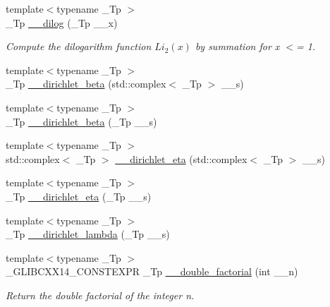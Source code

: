 \begin{DoxyCompactItemize}
\item 
{\footnotesize template$<$typename \+\_\+\+Tp $>$ }\\\+\_\+\+Tp \hyperlink{namespacestd_1_1____detail_a5083a0c9fce3299593ca22e7dbaeaf19}{\+\_\+\+\_\+dilog} (\+\_\+\+Tp \+\_\+\+\_\+x)
\begin{DoxyCompactList}\small\item\em Compute the dilogarithm function $ Li_2(x) $ by summation for x $<$= 1. \end{DoxyCompactList}\item 
{\footnotesize template$<$typename \+\_\+\+Tp $>$ }\\\+\_\+\+Tp \hyperlink{namespacestd_1_1____detail_ad0c8e975438d30cbfb5cad91f3ac6d01}{\+\_\+\+\_\+dirichlet\+\_\+beta} (std\+::complex$<$ \+\_\+\+Tp $>$ \+\_\+\+\_\+s)
\item 
{\footnotesize template$<$typename \+\_\+\+Tp $>$ }\\\+\_\+\+Tp \hyperlink{namespacestd_1_1____detail_a2e4243f8d092d48e16fc45ba0c4e9489}{\+\_\+\+\_\+dirichlet\+\_\+beta} (\+\_\+\+Tp \+\_\+\+\_\+s)
\item 
{\footnotesize template$<$typename \+\_\+\+Tp $>$ }\\std\+::complex$<$ \+\_\+\+Tp $>$ \hyperlink{namespacestd_1_1____detail_a3d8d694bf430ca3959c9e6b00c332468}{\+\_\+\+\_\+dirichlet\+\_\+eta} (std\+::complex$<$ \+\_\+\+Tp $>$ \+\_\+\+\_\+s)
\item 
{\footnotesize template$<$typename \+\_\+\+Tp $>$ }\\\+\_\+\+Tp \hyperlink{namespacestd_1_1____detail_a88be5bbcdf85bbc487b6b86b5cb65d98}{\+\_\+\+\_\+dirichlet\+\_\+eta} (\+\_\+\+Tp \+\_\+\+\_\+s)
\item 
{\footnotesize template$<$typename \+\_\+\+Tp $>$ }\\\+\_\+\+Tp \hyperlink{namespacestd_1_1____detail_a6ee8ae93ba65207de8ef3d6bb162b192}{\+\_\+\+\_\+dirichlet\+\_\+lambda} (\+\_\+\+Tp \+\_\+\+\_\+s)
\item 
{\footnotesize template$<$typename \+\_\+\+Tp $>$ }\\\+\_\+\+G\+L\+I\+B\+C\+X\+X14\+\_\+\+C\+O\+N\+S\+T\+E\+X\+PR \+\_\+\+Tp \hyperlink{namespacestd_1_1____detail_a06b0d9786afff0919c96f61d5f760c5f}{\+\_\+\+\_\+double\+\_\+factorial} (int \+\_\+\+\_\+n)
\begin{DoxyCompactList}\small\item\em Return the double factorial of the integer n. \end{DoxyCompactList}\item 

\end{DoxyCompactItemize}
